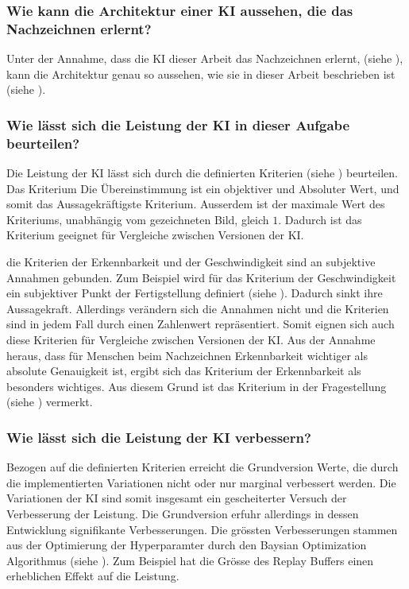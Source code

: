\subsubsection*{Wie kann die Architektur einer KI aussehen, die das Nachzeichnen erlernt?}\label{subsub:d_frage_unter_1}
Unter der Annahme, dass die KI dieser Arbeit das Nachzeichnen erlernt, (siehe
), kann die Architektur genau so aussehen, wie sie in
dieser Arbeit beschrieben ist (siehe ).

\subsubsection*{Wie lässt sich die Leistung der KI in dieser Aufgabe beurteilen?}\label{subsub:d_frage_unter_2}
Die Leistung der KI lässt sich durch die definierten Kriterien (siehe
) beurteilen. Das Kriterium Die Übereinstimmung ist ein
objektiver und Absoluter Wert, und somit das Aussagekräftigste Kriterium.
Ausserdem ist der maximale Wert des Kriteriums, unabhängig vom gezeichneten
Bild, gleich $1$. Dadurch ist das Kriterium geeignet für Vergleiche zwischen
Versionen der KI.

die Kriterien der Erkennbarkeit und der Geschwindigkeit sind an subjektive
Annahmen gebunden. Zum Beispiel wird für das Kriterium der Geschwindigkeit ein
subjektiver Punkt der Fertigstellung definiert (siehe
). Dadurch sinkt ihre Aussagekraft. Allerdings
verändern sich die Annahmen nicht und die Kriterien sind in jedem Fall durch
einen Zahlenwert repräsentiert. Somit eignen sich auch diese Kriterien für
Vergleiche zwischen Versionen der KI. Aus der Annahme heraus, dass für Menschen
beim Nachzeichnen Erkennbarkeit wichtiger als absolute Genauigkeit ist, ergibt
sich das Kriterium der Erkennbarkeit als besonders wichtiges. Aus diesem Grund
ist das Kriterium in der Fragestellung (siehe )
vermerkt.


\subsubsection*{Wie lässt sich die Leistung der KI verbessern?}\label{subsub:d_frage_unter_3}
Bezogen auf die definierten Kriterien erreicht die Grundversion Werte, die durch
die implementierten Variationen nicht oder nur marginal verbessert werden. Die
Variationen der KI sind somit insgesamt ein gescheiterter Versuch der
Verbesserung der Leistung. Die Grundversion erfuhr allerdings in dessen
Entwicklung signifikante Verbesserungen. Die grössten Verbesserungen stammen aus
der Optimierung der Hyperparamter durch den Baysian Optimization Algorithmus
(siehe ). Zum Beispiel hat die Grösse des Replay
Buffers einen erheblichen Effekt auf die Leistung.

